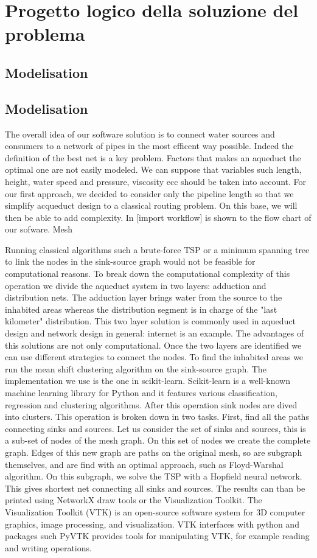 \chapter{Progetto logico della soluzione del problema}
\label{capitolo4}
\thispagestyle{empty}

\section {Modelisation}

\section {Modelisation}
The overall idea of our software solution is to connect water sources and consumers to a network of pipes in the most efficent way possible. Indeed the definition of the best net is a key problem. Factors that makes an aqueduct the optimal one are not easily modeled. We can suppose that variables such length, height, water speed and pressure, viscosity ecc should be taken into account.
\hfill For our first approach, we decided to consider only the pipeline length so that we simplify acqueduct design to a classical routing problem. On this base, we will then be able to add complexity.
\bigbreak
In [import workflow] is shown to the flow chart of our sofware. Mesh 

\noindent Running classical algorithms such a brute-force TSP or a minimum spanning tree to link
the nodes in the sink-source graph would not be feasible for computational reasons. To
break down the computational complexity of this operation we divide the aqueduct system
in two layers: adduction and distribution nets. The adduction layer brings water from the
source to the inhabited areas whereas the distribution segment is in charge of the "last
kilometer" distribution. This two layer solution is commonly used in aqueduct design and
network design in general: internet is an example. The advantages of this solutions are
not only computational. Once the two layers are identified we can use different strategies
to connect the nodes.
To find the inhabited areas we run the mean shift clustering algorithm on the sink-source
graph. The implementation we use is the one in scikit-learn. Scikit-learn is a well-known
machine learning library for Python and it features various classification, regression and
clustering algorithms. After this operation sink nodes are dived into clusters.
This operation is broken down in two tasks. First, find all the paths connecting sinks
and sources. Let us consider the set of sinks and sources, this is a sub-set of nodes of the
mesh graph. On this set of nodes we create the complete graph. Edges of this new graph
are paths on the original mesh, so are subgraph themselves, and are find with an optimal
approach, such as Floyd-Warshal algorithm. On this subgraph, we solve the TSP with a
Hopfield neural network. This gives shortest net connecting all sinks and sources.
The results can than be printed using NetworkX draw tools or the Visualization Toolkit.
The Visualization Toolkit (VTK) is an open-source software system for 3D computer
graphics, image processing, and visualization. VTK interfaces with python and packages
such PyVTK provides tools for manipulating VTK, for example reading and writing
operations.
